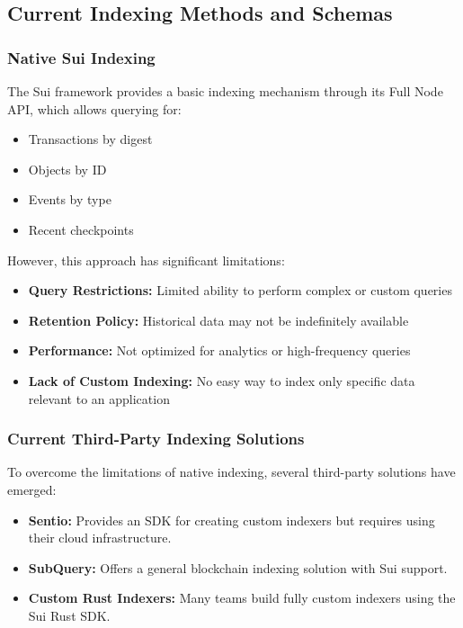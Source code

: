 \subsection{Current Indexing Methods and Schemas}

\subsubsection{Native Sui Indexing}

The Sui framework provides a basic indexing mechanism through its Full Node API, which allows querying for:

\begin{itemize}
    \item Transactions by digest
    \item Objects by ID
    \item Events by type
    \item Recent checkpoints
\end{itemize}

However, this approach has significant limitations:

\begin{itemize}
    \item \textbf{Query Restrictions:} Limited ability to perform complex or custom queries
    \item \textbf{Retention Policy:} Historical data may not be indefinitely available
    \item \textbf{Performance:} Not optimized for analytics or high-frequency queries
    \item \textbf{Lack of Custom Indexing:} No easy way to index only specific data relevant to an application
\end{itemize}

\subsubsection{Current Third-Party Indexing Solutions}

To overcome the limitations of native indexing, several third-party solutions have emerged:

\begin{itemize}
    \item \textbf{Sentio:} Provides an SDK for creating custom indexers but requires using their cloud infrastructure.
    \item \textbf{SubQuery:} Offers a general blockchain indexing solution with Sui support.
    \item \textbf{Custom Rust Indexers:} Many teams build fully custom indexers using the Sui Rust SDK.
\end{itemize}

